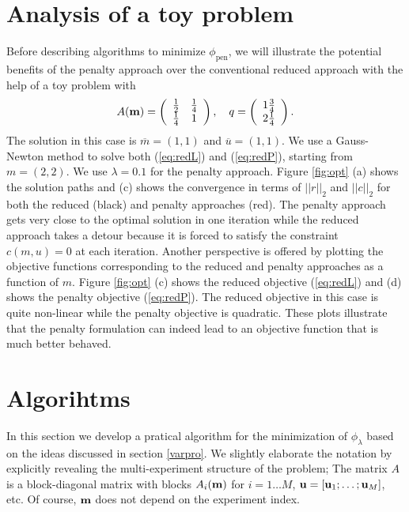 \documentclass{iopart}
\begin{document}
\section{Analysis of a toy problem}
\label{toy}
Before describing algorithms to minimize $\phi_{\mathrm{pen}}$, we will illustrate the potential benefits
of the penalty approach over the conventional reduced approach with the help of a toy problem with
\[
A(\mathbf{m}) = 
\left(\begin{array}{cc}
\frac{1}{2}&\frac{1}{4}\\
\frac{1}{4}&1\\
\end{array}\right),\quad
q = \left(\begin{array}{c}
1\frac{3}{4}\\
2\frac{1}{4}\\
\end{array}\right).
\]
The solution in this case is $\overline{m} = (1,1)$ and $\overline{u} =
(1,1)$. We use a Gauss-Newton method to solve both (\ref{eq:redL}) and (\ref{eq:redP}), starting from $m = (2,2)$. We use $\lambda = 0.1$ for the penalty approach.
Figure \ref{fig:opt} (a) shows the solution paths and (c) shows the convergence in terms of $||r||_2$ and $||c||_2$ for both the reduced
(black) and penalty approaches (red). The penalty approach gets very
close to the optimal solution in one iteration while the reduced
approach takes a detour because it is forced to satisfy the constraint
$c(m,u)=0$ at each iteration. Another perspective is offered by plotting the objective functions corresponding to the reduced and penalty approaches as a function of $m$.
Figure \ref{fig:opt} (c) shows the reduced objective (\ref{eq:redL}) and (d) shows the penalty objective (\ref{eq:redP}). The reduced objective in this case is quite non-linear while the penalty objective is quadratic.
These plots illustrate that the penalty formulation can indeed lead to an objective function that is much better behaved.

\section{Algorihtms}
\label{algorithm}
In this section we develop a pratical algorithm for the minimization of $\phi_{\lambda}$ based 
on the ideas discussed in section \ref{varpro}. We slightly elaborate the notation by explicitly revealing the multi-experiment structure of the problem;
The matrix $A$ is a block-diagonal matrix with blocks $A_i(\mathbf{m})$ for $i=1\ldots M$, $\mathbf{u} = [\mathbf{u}_1; \ldots; \mathbf{u}_{M}]$, etc.
Of course, $\mathbf{m}$ does not depend on the experiment index.
\end{document}
